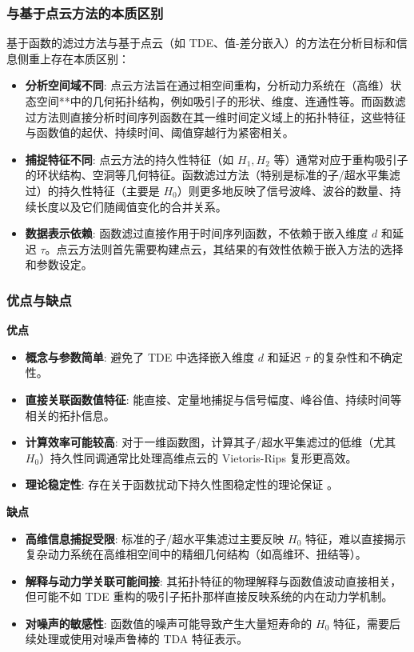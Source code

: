 \subsubsection{与基于点云方法的本质区别}
\label{sec:func_vs_pointcloud}
基于函数的滤过方法与基于点云（如 TDE、值-差分嵌入）的方法在分析目标和信息侧重上存在本质区别：
\begin{itemize}
    \item \textbf{分析空间域不同}: 点云方法旨在通过相空间重构，分析动力系统在（高维）状态空间**中的几何拓扑结构，例如吸引子的形状、维度、连通性等。而函数滤过方法则直接分析时间序列函数在其一维时间定义域上的拓扑特征，这些特征与函数值的起伏、持续时间、阈值穿越行为紧密相关。
    \item \textbf{捕捉特征不同}: 点云方法的持久性特征（如 $H_1, H_2$ 等）通常对应于重构吸引子的环状结构、空洞等几何特征。函数滤过方法（特别是标准的子/超水平集滤过）的持久性特征（主要是 $H_0$）则更多地反映了信号波峰、波谷的数量、持续长度以及它们随阈值变化的合并关系。
    \item \textbf{数据表示依赖}: 函数滤过直接作用于时间序列函数，不依赖于嵌入维度 $d$ 和延迟 $\tau$。点云方法则首先需要构建点云，其结果的有效性依赖于嵌入方法的选择和参数设定。
\end{itemize}

\subsubsection{优点与缺点}
\label{sec:func_filtration_pros_cons}
\textbf{优点}
\begin{itemize}
    \item \textbf{概念与参数简单}: 避免了 TDE 中选择嵌入维度 $d$ 和延迟 $\tau$ 的复杂性和不确定性。
    \item \textbf{直接关联函数值特征}: 能直接、定量地捕捉与信号幅度、峰谷值、持续时间等相关的拓扑信息。
    \item \textbf{计算效率可能较高}: 对于一维函数图，计算其子/超水平集滤过的低维（尤其 $H_0$）持久性同调通常比处理高维点云的 Vietoris-Rips 复形更高效。
    \item \textbf{理论稳定性}: 存在关于函数扰动下持久性图稳定性的理论保证 \cite{Chung2020PHApproachTSC, CohenSteiner2007StabilityPD}。
\end{itemize}

\textbf{缺点}
\begin{itemize}
    \item \textbf{高维信息捕捉受限}: 标准的子/超水平集滤过主要反映 $H_0$ 特征，难以直接揭示复杂动力系统在高维相空间中的精细几何结构（如高维环、扭结等）。
    \item \textbf{解释与动力学关联可能间接}: 其拓扑特征的物理解释与函数值波动直接相关，但可能不如 TDE 重构的吸引子拓扑那样直接反映系统的内在动力学机制。
    \item \textbf{对噪声的敏感性}: 函数值的噪声可能导致产生大量短寿命的 $H_0$ 特征，需要后续处理或使用对噪声鲁棒的 TDA 特征表示。
\end{itemize}

